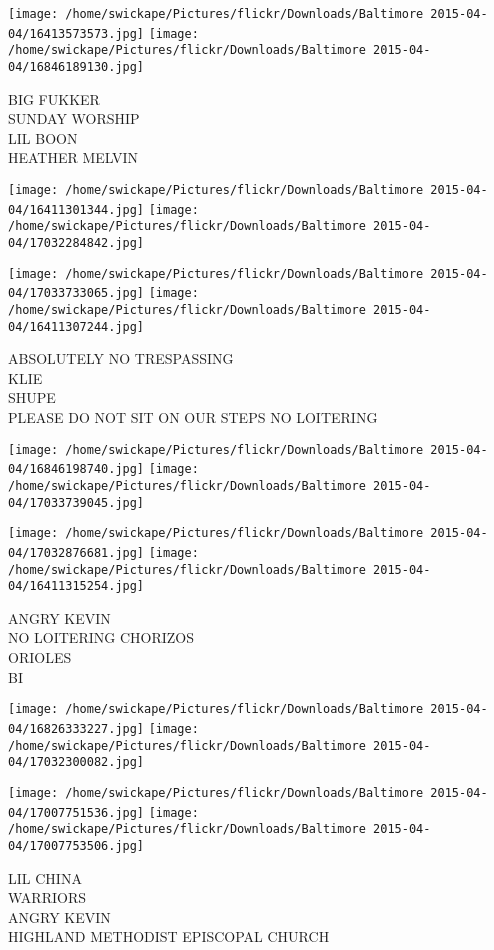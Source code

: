\documentclass[10pt,letterpaper]{article}
\begin{document}
\texttt{[image: /home/swickape/Pictures/flickr/Downloads/Baltimore 2015-04-04/16413573573.jpg]}
\texttt{[image: /home/swickape/Pictures/flickr/Downloads/Baltimore 2015-04-04/16846189130.jpg]}

BIG FUKKER\\
SUNDAY WORSHIP\\
LIL BOON\\
HEATHER MELVIN
\pagebreak

\texttt{[image: /home/swickape/Pictures/flickr/Downloads/Baltimore 2015-04-04/16411301344.jpg]}
\texttt{[image: /home/swickape/Pictures/flickr/Downloads/Baltimore 2015-04-04/17032284842.jpg]}

\texttt{[image: /home/swickape/Pictures/flickr/Downloads/Baltimore 2015-04-04/17033733065.jpg]}
\texttt{[image: /home/swickape/Pictures/flickr/Downloads/Baltimore 2015-04-04/16411307244.jpg]}

ABSOLUTELY NO TRESPASSING\\
KLIE\\
SHUPE\\
PLEASE DO NOT SIT ON OUR STEPS NO LOITERING
\pagebreak

\texttt{[image: /home/swickape/Pictures/flickr/Downloads/Baltimore 2015-04-04/16846198740.jpg]}
\texttt{[image: /home/swickape/Pictures/flickr/Downloads/Baltimore 2015-04-04/17033739045.jpg]}

\texttt{[image: /home/swickape/Pictures/flickr/Downloads/Baltimore 2015-04-04/17032876681.jpg]}
\texttt{[image: /home/swickape/Pictures/flickr/Downloads/Baltimore 2015-04-04/16411315254.jpg]}

ANGRY KEVIN\\
NO LOITERING CHORIZOS\\
ORIOLES\\
BI
\pagebreak

\texttt{[image: /home/swickape/Pictures/flickr/Downloads/Baltimore 2015-04-04/16826333227.jpg]}
\texttt{[image: /home/swickape/Pictures/flickr/Downloads/Baltimore 2015-04-04/17032300082.jpg]}

\texttt{[image: /home/swickape/Pictures/flickr/Downloads/Baltimore 2015-04-04/17007751536.jpg]}
\texttt{[image: /home/swickape/Pictures/flickr/Downloads/Baltimore 2015-04-04/17007753506.jpg]}

LIL CHINA\\
WARRIORS\\
ANGRY KEVIN\\
HIGHLAND METHODIST EPISCOPAL CHURCH
\pagebreak
\end{document}
